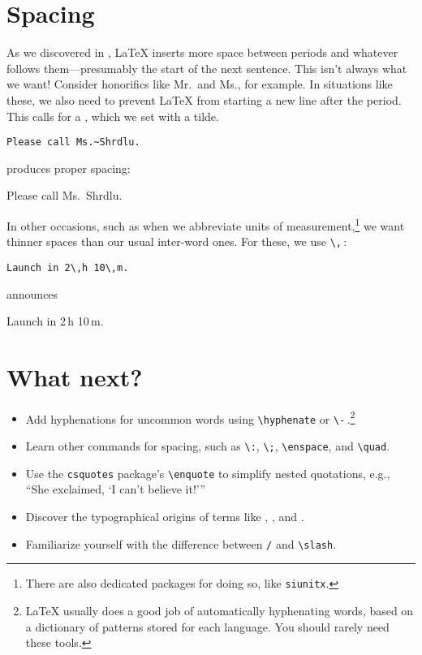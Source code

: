 \section{Spacing}

As we discovered in ,
\LaTeX{} inserts more space between periods and whatever
follows them---presumably the start of the next sentence.
This isn't always what we want!
Consider honorifics like Mr.\ and Ms., for example.
In situations like these, we also need to prevent \LaTeX{} from starting a
new line after the period.
This calls for a , which we set with a tilde.
\begin{leftfigure}
\begin{lstlisting}
Please call Ms.~Shrdlu.
\end{lstlisting}
\end{leftfigure}
produces proper spacing:
\begin{leftfigure}
\lm%
Please call Ms.~Shrdlu.
\end{leftfigure}

In other occasions, such as when we abbreviate units of
measurement,\punckern\footnote{There are also dedicated packages for doing so,
like \texttt{siunitx}.}
we want thinner spaces than our usual inter-word ones.
For these, we use \verb|\,|\,:
\begin{leftfigure}
\begin{lstlisting}
Launch in 2\,h 10\,m.
\end{lstlisting}
\end{leftfigure}
announces
\begin{leftfigure}
\lm%
Launch in 2\,h 10\,m.
\end{leftfigure}

\section{What next?}
\begin{itemize}
\item Add hyphenations for uncommon words using \verb|\hyphenate|
    or \verb|\-|\,.\punckern\footnote{\LaTeX{} usually does a good
    job of automatically hyphenating words, based on a dictionary of patterns
    stored for each language. You should rarely need these tools.}
\item Learn other commands for spacing, such as \verb|\:|, \verb|\;|,
    \verb|\enspace|, and \verb|\quad|.
\item Use the \texttt{csquotes} package's \verb|\enquote| to simplify
    nested quotations, e.g., \\
    \enquote{She exclaimed, \enquote{I can't believe it!}}
\item Discover the typographical origins of terms like ,
    , and .
\item Familiarize yourself with the difference between \texttt{/} and
    \verb|\slash|.
\end{itemize}
